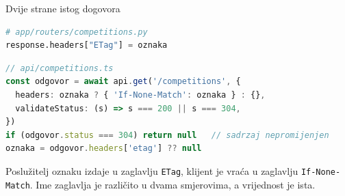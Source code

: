 \begin{frame}[fragile]{Dvije strane istog dogovora}
\vspace{-0.3em}
\begin{lstlisting}[language=python]
# app/routers/competitions.py
response.headers["ETag"] = oznaka
\end{lstlisting}

\vspace{-0.2em}
\begin{lstlisting}[language=typescript]
// api/competitions.ts
const odgovor = await api.get('/competitions', {
  headers: oznaka ? { 'If-None-Match': oznaka } : {},
  validateStatus: (s) => s === 200 || s === 304,
})
if (odgovor.status === 304) return null   // sadrzaj nepromijenjen
oznaka = odgovor.headers['etag'] ?? null
\end{lstlisting}

\vspace{0.2em}
Poslužitelj oznaku izdaje u zaglavlju \texttt{ETag}, klijent je vraća u zaglavlju \texttt{If-None-Match}. Ime zaglavlja je različito u dvama smjerovima, a vrijednost je ista.
\end{frame}


